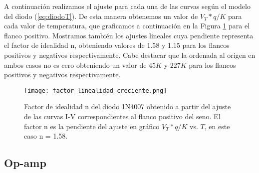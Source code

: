 \documentclass[a4paper, 11pt]{article}
\begin{document}
A continuación realizamos el ajuste para cada una de las curvas según el modelo del diodo (\ref{eq:diodoT}). De esta manera obtenemos un valor de $V_T*q/K$ para cada valor de temperatura, que graficamos a continuación en la Figura \ref{fig:factor_linealidad_creciente} para el flanco positivo. Mostramos también los ajustes lineales cuya pendiente representa el factor de idealidad n, obteniendo valores de 1.58 y 1.15 para los flancos positivos y negativos respectivamente. Cabe destacar que la ordenada al origen en ambos casos no es cero obteniendo un valor de $45 K$ y $227 K$ para los flancos positivos y negativos respectivamente.

\begin{figure} [H]
\centering
\texttt{[image: factor\_linealidad\_creciente.png]}
\caption{Factor de idealidad n del diodo 1N4007 obtenido a partir del ajuste de las curvas I-V correspondientes al flanco positivo del seno. El factor n es la pendiente del ajuste en gráfico $V_T*q/K$ vs. $ T$, en este caso n = 1.58.\label{fig:factor_linealidad_creciente}}
\end{figure} 



\subsection*{Op-amp}

%
%
%
\end{document}
